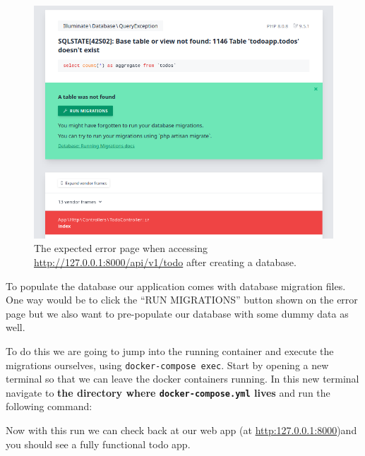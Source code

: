 \documentclass{csse4400}
\begin{document}
\begin{figure}[ht]
\includegraphics[width=\textwidth]{images/missing-tables}
\caption{The expected error page when accessing \url{http://127.0.0.1:8000/api/v1/todo} after creating a database.}
\label{fig:missing-tables}
\end{figure}

To populate the database our application comes with database migration files.
One way would be to click the ``RUN MIGRATIONS'' button shown on the error page but we also want to pre-populate our database with some dummy data as well.

To do this we are going to jump into the running container and execute the migrations ourselves, using \texttt{docker-compose exec}.
Start by opening a new terminal so that we can leave the docker containers running.
In this new terminal navigate to \textbf{the directory where \texttt{docker-compose.yml} lives} and run the following 
command:


\noindent Now with this run we can check back at our web app (at \url{http:127.0.0.1:8000})and you should see a fully functional todo app.
\end{document}
